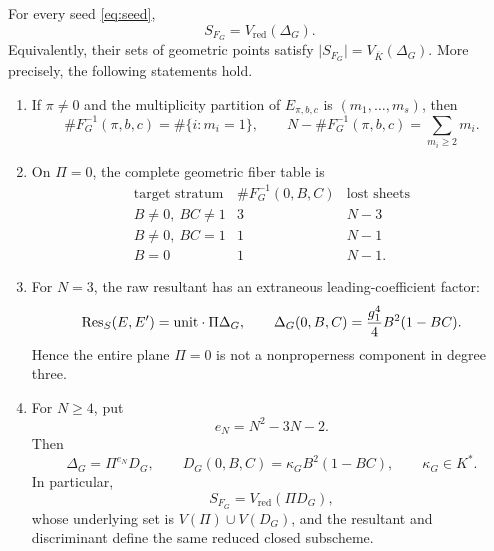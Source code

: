 \begin{theorem}
\label{thm:exact-nonproperness}
For every seed \eqref{eq:seed},
\begin{equation}
 \boxed{S_{F_G}=V_{\mathrm{red}}(\Delta_G).}
 \label{eq:jelonek-discriminant}
\end{equation}
Equivalently, their sets of geometric points satisfy
\(\lvert S_{F_G}\rvert=V_{\overline K}(\Delta_G)\).
More precisely, the following statements hold.
\begin{enumerate}
\item If \(\pi\neq0\) and the multiplicity partition of
      \(E_{\pi,b,c}\) is \((m_1,\ldots,m_s)\), then
      \begin{equation}
       \#F_G^{-1}(\pi,b,c)=\#\{i:m_i=1\},
       \qquad
       N-\#F_G^{-1}(\pi,b,c)=\sum_{m_i\geq2}m_i.
       \label{eq:partition-sheet-loss}
      \end{equation}
\item On \(\Pi=0\), the complete geometric fiber table is
      \begin{equation}
      \begin{array}{c|c|c}
       \text{target stratum}&\#F_G^{-1}(0,B,C)&\text{lost sheets}\\ \hline
       B\neq0,\ BC\neq1&3&N-3\\
       B\neq0,\ BC=1&1&N-1\\
       B=0&1&N-1.
      \end{array}
      \label{eq:pi-zero-fiber-table}
      \end{equation}
\item For \(N=3\), the raw resultant has an extraneous leading-coefficient
      factor:
      \[
       \operatorname{Res}_S(E,E')=\text{\rm unit}\cdot\Pi\Delta_G,
       \qquad
       \Delta_G(0,B,C)=\frac{g_1^4}{4}B^2(1-BC).
      \]
      Hence the entire plane \(\Pi=0\) is not a nonproperness component in
      degree three.
\item For \(N\geq4\), put
      \[
       e_N=N^2-3N-2.
      \]
      Then
      \begin{equation}
       \Delta_G=\Pi^{e_N}D_G,
       \qquad
       D_G(0,B,C)=\kappa_G B^2(1-BC),
       \qquad \kappa_G\in K^*.
       \label{eq:saturated-discriminant}
      \end{equation}
      In particular,
      \[
       S_{F_G}=V_{\mathrm{red}}(\Pi D_G),
      \]
      whose underlying set is \(V(\Pi)\cup V(D_G)\), and the resultant and
      discriminant define the same reduced closed subscheme.
\end{enumerate}
\end{theorem}

